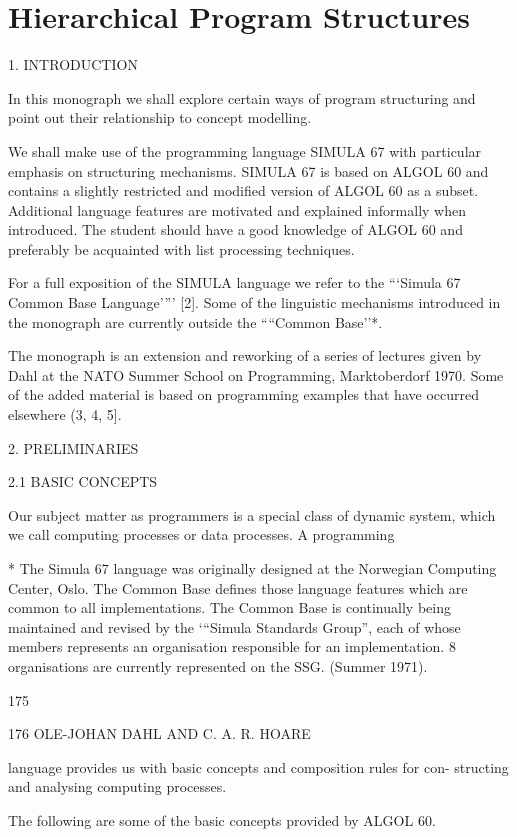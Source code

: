 \chapter{Hierarchical Program Structures}

1. INTRODUCTION

In this monograph we shall explore certain ways of program structuring and point out their relationship to concept modelling.

We shall make use of the programming language SIMULA 67 with particular emphasis on structuring mechanisms. SIMULA 67 is based on ALGOL 60 and contains a slightly restricted and modified version of ALGOL 60 as a subset. Additional language features are motivated and explained informally when introduced. The student should have a good knowledge of ALGOL 60 and preferably be acquainted with list processing techniques.

For a full exposition of the SIMULA language we refer to the “‘Simula 67 Common Base Language’”’ [2]. Some of the linguistic mechanisms introduced in the monograph are currently outside the ““Common Base’’*.

The monograph is an extension and reworking of a series of lectures given by Dahl at the NATO Summer School on Programming, Marktoberdorf 1970. Some of the added material is based on programming examples that have occurred elsewhere (3, 4, 5].

2. PRELIMINARIES

2.1 BASIC CONCEPTS

Our subject matter as programmers is a special class of dynamic system, which we call computing processes or data processes. A programming

* The Simula 67 language was originally designed at the Norwegian Computing Center, Oslo. The Common Base defines those language features which are common to all implementations. The Common Base is continually being maintained and revised by the ‘“Simula Standards Group”, each of whose members represents an organisation responsible for an implementation. 8 organisations are currently represented on the SSG. (Summer 1971).

175

176 OLE-JOHAN DAHL AND C. A. R. HOARE

language provides us with basic concepts and composition rules for con- structing and analysing computing processes.

The following are some of the basic concepts provided by ALGOL 60.

